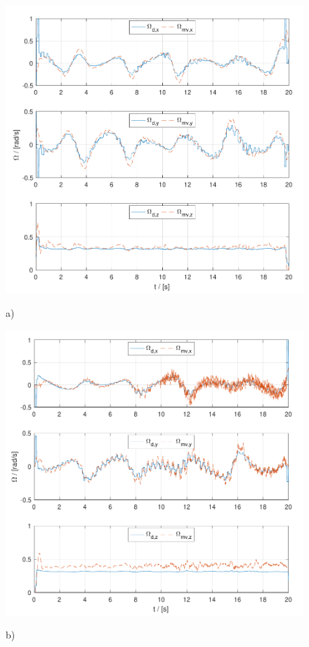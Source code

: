 \begin{figure}
	\centering
	\begin{minipage}{0.5\columnwidth}
		\centering
		\includegraphics[width=\columnwidth]{./pictures/mmcuav_omega.pdf}
		\caption*{a)}
		\label{fig:mmcuav_omega}
	\end{minipage}%
	\begin{minipage}{0.5\columnwidth}
		\centering
		\includegraphics[width=\columnwidth]{./pictures/mmuav_omega.pdf}
		\caption*{b)}
		\label{fig:mmuav_omega}
	\end{minipage}
	\caption{}
\end{figure}

